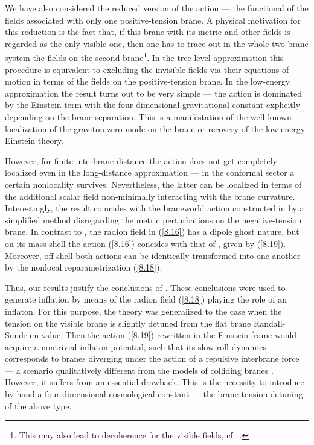 \documentclass[a4paper,preprint,nofootinbib,
                 showpacs,preprintnumbers,amsmath,amssymb]{revtex4}
\begin{document}
We have also considered the reduced version of the action --- the functional  
of the fields associated 
with only one positive-tension brane. A physical motivation for 
this reduction is the fact that, if this brane with its metric and 
other fields is regarded as the only visible one, then one has to 
trace out in the whole two-brane system the fields on the second 
brane\footnote{This may also lead to decoherence for the 
visible fields, cf.~\cite{Karpacz}.}. 
In the tree-level approximation this procedure is 
equivalent to excluding the invisible fields via their equations 
of motion in terms of the fields on the positive-tension brane.  
In the low-energy 
approximation the result turns out to be very simple --- the action 
is dominated by the Einstein term with the four-dimensional 
gravitational constant explicitly depending on the brane separation. 
This is a manifestation of the well-known localization of the 
graviton zero mode on the brane or recovery of the low-energy 
Einstein theory. 
 
However, for finite interbrane distance the action does not get 
completely localized even in the long-distance approximation --- in 
the conformal sector a certain nonlocality survives.  Nevertheless, 
the latter can be localized in terms of the additional scalar 
field non-minimally interacting with the brane curvature. 
Interestingly, the result coincides with the braneworld action 
constructed in \cite{brane} by a simplified method disregarding 
the metric perturbations on the negative-tension brane. In 
contrast to \cite{brane}, the radion field in (\ref{8.16}) has a 
dipole ghost nature, but on its mass shell the action 
(\ref{8.16}) concides with that of \cite{brane}, given by (\ref{8.19}). 
Moreover, off-shell both actions can be identically 
transformed into one another by the nonlocal reparametrization 
(\ref{8.18}). 
 
Thus, our results justify the conclusions of \cite{brane}.  
These conclusions were used to generate inflation by means of  
the radion field (\ref{8.18}) playing the role of an inflaton. For this 
purpose, the theory was generalized to the case when the tension on 
the visible brane is slightly detuned from the flat brane 
Randall-Sundrum value. Then the action (\ref{8.19}) rewritten in 
the Einstein frame would acquire a nontrivial inflaton potential, 
such that its slow-roll dynamics corresponds to branes diverging 
under the action of a repulsive interbrane force --- a scenario 
qualitatively different from the models of colliding branes  
\cite{DvTyeSh,Ekpyr,brantibr}. However, it suffers 
from an essential drawback. This is the necessity to introduce by hand 
a four-dimensional cosmological constant --- the brane 
tension detuning of the above type.  
 
\end{document}
